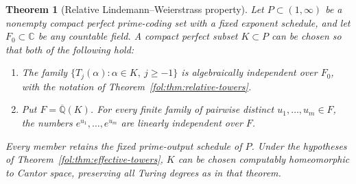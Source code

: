 \documentclass[11pt,a4paper]{article}
\newtheorem{theorem}{Theorem}[section]
\theoremstyle{definition}
\theoremstyle{remark}
\numberwithin{equation}{section}
\begin{document}
\begin{theorem}[Relative Lindemann--Weierstrass property]
\label{fol:thm:relative-exponential-field}
Let $P\subset(1,\infty)$ be a nonempty compact perfect prime-coding set
with a fixed exponent schedule, and let $F_0\subset\mathbb C$ be any
countable field.  A compact perfect subset $K\subset P$ can be chosen
so that both of the following hold:
\begin{enumerate}
\item The family
$\{T_j(\alpha):\alpha\in K,\ j\ge-1\}$ is algebraically independent
over $F_0$, with the notation of Theorem~\ref{fol:thm:relative-towers}.
\item Put $F=\overline{\mathbb Q}(K)$.  For every finite family of
pairwise distinct $u_1,\ldots,u_m\in F$, the numbers
$e^{u_1},\ldots,e^{u_m}$ are linearly independent over $F$.
\end{enumerate}
Every member retains the fixed prime-output schedule of $P$.
Under the hypotheses of Theorem~\ref{fol:thm:effective-towers}, $K$ can be
chosen computably homeomorphic to Cantor space, preserving all Turing
degrees as in that theorem.
\end{theorem}
\end{document}
